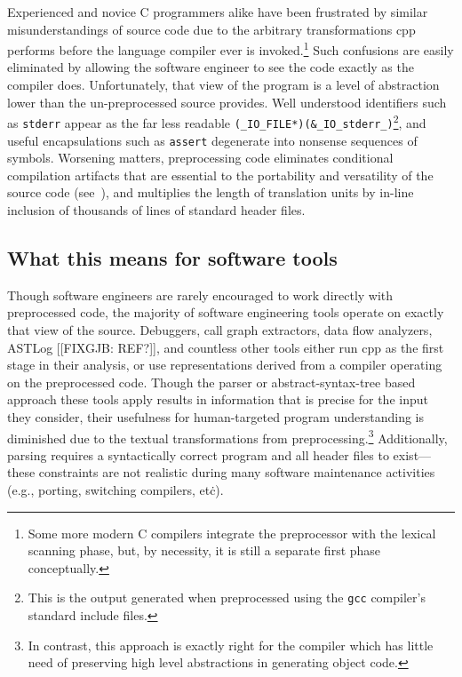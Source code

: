 \documentclass{article}
\newcommand{\Cpp}{\mbox{\textsf{cpp}}}
\newcommand{\C}{\mbox{\textsf{C}}}
\newcommand{\eg}{e.g.,}
\newcommand{\etc}{etc\.}
\begin{document}
Experienced and novice \C{} programmers alike have been frustrated by
similar misunderstandings of source code due to the arbitrary
transformations \Cpp{} performs before the language compiler ever is
invoked.\footnote{Some more modern \C{} compilers integrate the
  preprocessor with the lexical scanning phase, but, by necessity, it is
  still a separate first phase conceptually.}  Such confusions are
easily eliminated by allowing the software engineer to see the code
exactly as the compiler does.  Unfortunately, that view of the program
is a level of abstraction lower than the un-preprocessed source
provides.  Well understood identifiers such as \texttt{stderr} appear as
the far less readable
\texttt{(\_IO\_FILE*)(\&\_IO\_stderr\_)}\footnote{This is the output
  generated when preprocessed using the \texttt{gcc} compiler's standard
  include files.}, and useful encapsulations such as \texttt{assert}
degenerate into nonsense sequences of symbols.  Worsening matters,
preprocessing code eliminates conditional compilation artifacts that are
essential to the portability and versatility of the source code
(see~\cite{Krone94}), and multiplies the length of translation units by
in-line inclusion of thousands of lines of standard header files.

\subsection{What this means for software tools}

Though software engineers are rarely encouraged to work directly with
preprocessed code, the majority of software engineering tools operate on
exactly that view of the source.  Debuggers, call graph extractors, data
flow analyzers, ASTLog [[FIXGJB: REF?]], and countless other tools
either run \Cpp{} as the first stage in their analysis, or use
representations derived from a compiler operating on the preprocessed
code.  Though the parser or abstract-syntax-tree based approach these
tools apply results in information that is precise for the input they
consider, their usefulness for human-targeted program understanding is
diminished due to the textual transformations from
preprocessing.\footnote{In contrast, this approach is exactly right for
  the compiler which has little need of preserving high level
  abstractions in generating object code.}  Additionally, parsing
requires a syntactically correct program and all header files to
exist---these constraints are not realistic during many software
maintenance activities (\eg{} porting, switching compilers, \etc{}).
\end{document}
